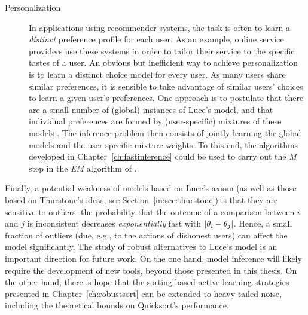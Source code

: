\begin{description}
\item[Personalization] In applications using recommender systems, the task is often to learn a \emph{distinct} preference profile for each user.
As an example, online service providers use these systems in order to tailor their service to the specific tastes of a user.
An obvious but inefficient way to achieve personalization is to learn a distinct choice model for every user.
As many users share similar preferences, it is sensible to take advantage of similar users' choices to learn a given user's preferences.
One approach is to postulate that there are a small number of (global) instances of Luce's model, and that individual preferences are formed by (user-specific) mixtures of these models \citep{gormley2008exploring, ammar2015ranked}.
The inference problem then consists of jointly learning the global models and the user-specific mixture weights.
To this end, the algorithms developed in Chapter~\ref{ch:fastinference} could be used to carry out the \emph{M} step in the \emph{EM} algorithm of \citet{gormley2008exploring}.
\end{description}

Finally, a potential weakness of models based on Luce's axiom (as well as those based on Thurstone's ideas, see Section~\ref{in:sec:thurstone}) is that they are sensitive to outliers: the probability that the outcome of a comparison between $i$ and $j$ is inconsistent decreases \emph{exponentially} fast with $\lvert\theta_i - \theta_j\rvert$.
Hence, a small fraction of outliers (due, e.g., to the actions of dishonest users) can affect the model significantly.
The study of robust alternatives to Luce's model is an important direction for future work.
On the one hand, model inference will likely require the development of new tools, beyond those presented in this thesis.
On the other hand, there is hope that the sorting-based active-learning strategies presented in Chapter~\ref{ch:robustsort} can be extended to heavy-tailed noise, including the theoretical bounds on Quicksort's performance.
